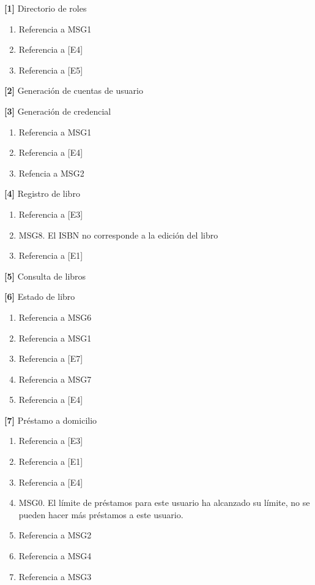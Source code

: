 \begin{Citemize}
	\item {\bf [1]} Directorio de roles
		\begin{enumerate}
			\item Referencia a MSG1
			\item Referencia a [E4]
			\item Referencia a [E5] 
		\end{enumerate}
	\item {\bf [2]} Generación de cuentas de usuario
	\item {\bf [3]} Generación de credencial
		\begin{enumerate}
			\item Referencia a MSG1
			\item Referencia a [E4]
			\item Refencia a MSG2
		\end{enumerate}		 
	\item {\bf [4]} Registro de libro
		\begin{enumerate}
			\item Referencia a [E3]
			\item MSG8. El ISBN no corresponde a la edición del libro
			\item Referencia a [E1]	
		\end{enumerate}
	\item {\bf [5]} Consulta de libros
	\item {\bf [6]} Estado de libro
		\begin{enumerate}
			\item Referencia a MSG6
			\item Referencia a MSG1
			\item Referencia a [E7]
			\item Referencia a MSG7
			\item Referencia a [E4]
		\end{enumerate}
	\item {\bf [7]} Préstamo a domicilio
		\begin{enumerate}
			\item Referencia a [E3]
			\item Referencia a [E1]
			\item Referencia a [E4]
			\item MSG0. El límite de préstamos para este usuario ha alcanzado su límite, no se pueden hacer más préstamos a este usuario.
			\item Referencia a MSG2
			\item Referencia a MSG4
			\item Referencia a MSG3

\end{enumerate}
\end{Citemize}
